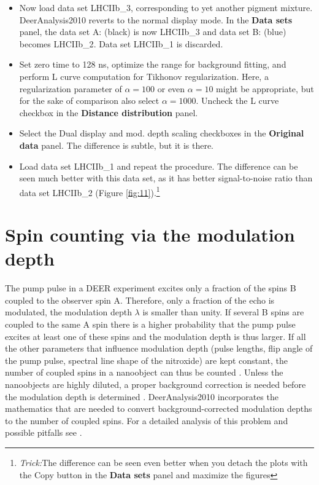 \documentclass[11pt,a4paper]{article}
\begin{document}
\begin{itemize}
	\item Now load data set {\ttfamily LHCIIb\_3}, corresponding to yet another pigment mixture. DeerAnalysis2010 reverts to the normal display mode. In the {\ttfamily \bf Data sets} panel, the data set {\ttfamily A:} (black) is now {\ttfamily LHCIIb\_3} and data set {\ttfamily B:} (blue) becomes {\ttfamily LHCIIb\_2}. Data set {\ttfamily LHCIIb\_1} is discarded.
	\item Set zero time to 128 ns, optimize the range for background fitting, and perform L curve computation for Tikhonov regularization. Here, a regularization parameter of $\alpha = 100$ or even $\alpha = 10$ might be appropriate, but for the sake of comparison also select $\alpha = 1000$. Uncheck the {\ttfamily L curve} checkbox in the {\ttfamily \bf Distance distribution} panel.
	\item Select the {\ttfamily Dual display} and {\ttfamily mod. depth scaling} checkboxes in the {\ttfamily \bf Original data} panel. The difference is subtle, but it is there.  
	\item Load data set {\ttfamily LHCIIb\_1} and repeat the procedure. The difference can be seen much better with this data set, as it has better signal-to-noise ratio than data set {\ttfamily LHCIIb\_2} (Figure \ref{fig:11}).\footnote{\emph{Trick:}The difference can be seen even better when you detach the plots with the {\ttfamily Copy} button in the {\ttfamily \bf Data sets} panel and maximize the figures}  
\end{itemize}

\section{Spin counting via the modulation depth}

The pump pulse in a DEER experiment excites only a fraction of the spins B coupled to the observer spin A. Therefore, only a fraction of the echo is modulated, the modulation depth $\lambda$ is smaller than unity. If several B spins are coupled to the same A spin there is a higher probability that the pump pulse excites at least one of these spins and the modulation depth is thus larger. If all the other parameters that influence modulation depth (pulse lengths, flip angle of the pump pulse, spectral line shape of the nitroxide) are kept constant, the number of coupled spins in a nanoobject can thus be counted \cite{milov1984,hilger2005,bode2007}. Unless the nanoobjects are highly diluted, a proper background correction is needed before the modulation depth is determined \cite{jeschke2004}. DeerAnalysis2010 incorporates the mathematics that are needed to convert background-corrected modulation depths to the number of coupled spins. For a detailed analysis of this problem and possible pitfalls see \cite{bode2007}.
\end{document}
